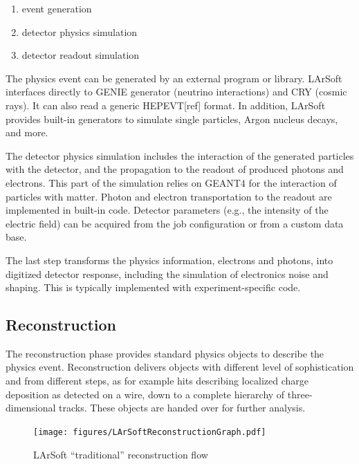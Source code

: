 \begin{enumerate}
\def\labelenumi{\arabic{enumi}.}
\item
  event generation
\item
  detector physics simulation
\item
  detector readout simulation
\end{enumerate}

The physics event can be generated by an external program or library.
LArSoft interfaces directly to GENIE generator (neutrino interactions)
and CRY (cosmic rays). It can also read a generic HEPEVT{[}ref{]}
format. In addition, LArSoft provides built-in generators to simulate
single particles, Argon nucleus decays, and more.

The detector physics simulation includes the interaction of the
generated particles with the detector, and the propagation to the
readout of produced photons and electrons. This part of the simulation
relies on GEANT4 for the interaction of particles with matter. Photon
and electron transportation to the readout are implemented in built-in
code. Detector parameters (e.g., the intensity of the electric field)
can be acquired from the job configuration or from a custom data base.

The last step transforms the physics information, electrons and photons,
into digitized detector response, including the simulation of
electronics noise and shaping. This is typically implemented with
experiment-specific code.

\subsection{Reconstruction}\label{reconstruction}

The reconstruction phase provides standard physics objects to describe
the physics event. Reconstruction delivers objects with different level
of sophistication and from different steps, as for example hits
describing localized charge deposition as detected on a wire, down to a
complete hierarchy of three-dimensional tracks. These objects are handed
over for further analysis.

\begin{figure}[htbp]
\centering
\texttt{[image: figures/LArSoftReconstructionGraph.pdf]}
\caption{\label{fig:LArSoftReconstruction}LArSoft ``traditional''
reconstruction flow}
\end{figure}

